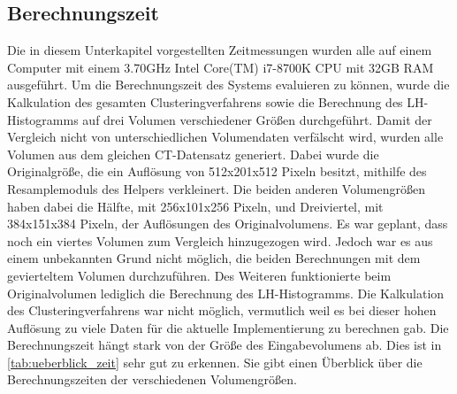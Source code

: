\subsection{Berechnungszeit}

Die in diesem Unterkapitel vorgestellten Zeitmessungen wurden alle auf einem Computer mit einem 3.70GHz  Intel Core(TM) i7-8700K CPU mit 32GB RAM ausgeführt.
Um die Berechnungszeit des Systems evaluieren zu können, wurde die Kalkulation des gesamten Clusteringverfahrens sowie die Berechnung des LH-Histogramms auf drei Volumen verschiedener Größen durchgeführt. Damit der Vergleich nicht von unterschiedlichen Volumendaten verfälscht wird, wurden alle Volumen aus dem gleichen CT-Datensatz generiert.
\newline
Dabei wurde die Originalgröße, die ein Auflösung von 512x201x512 Pixeln besitzt, mithilfe des Resamplemoduls des Helpers verkleinert. Die beiden anderen Volumengrößen haben dabei die  Hälfte, mit 256x101x256 Pixeln, und Dreiviertel, mit 384x151x384 Pixeln, der Auflösungen des Originalvolumens.
Es war geplant, dass noch ein viertes Volumen zum Vergleich hinzugezogen wird. Jedoch war es aus einem unbekannten Grund nicht möglich, die beiden Berechnungen mit dem gevierteltem Volumen durchzuführen.
Des Weiteren funktionierte beim Originalvolumen lediglich die Berechnung des LH-Histogramms. Die Kalkulation des Clusteringverfahrens war nicht möglich, vermutlich weil es bei dieser hohen Auflösung zu viele Daten für die aktuelle Implementierung zu berechnen gab.
Die Berechnungszeit hängt stark von der Größe des Eingabevolumens ab. Dies ist in \autoref{tab:ueberblick_zeit} sehr gut zu erkennen. Sie gibt einen Überblick über die  Berechnungszeiten der verschiedenen Volumengrößen.


\begin{table}[h]
\centering
{}
\caption{Überblick über die Berechnungszeiten der verschiedenen Volumengrößen}
\label{tab:ueberblick_zeit}
\end{table}


